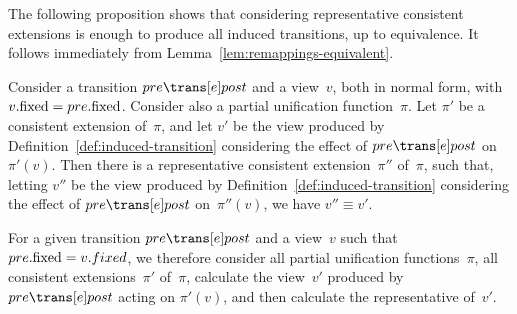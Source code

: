 
The following proposition shows that considering representative consistent
extensions is enough to produce all induced transitions, up to equivalence.
It follows immediately from Lemma~\ref{lem:remappings-equivalent}.
%
\begin{prop}
\label{prop:unifying-remapping}
Consider a transition $pre \trans[e] post$ and a view~$v$, both in normal
form, with $v.\mathrm{fixed} = pre.\mathrm{fixed}$.  Consider also a partial unification
function~$\pi$.
%
Let $\pi'$ be a consistent extension of~$\pi$, and
let $v'$ be the view produced by Definition~\ref{def:induced-transition}
considering the effect of $pre \trans[e] post$ on~$\pi'(v)$.  
%
Then there is a representative consistent extension~$\pi''$ of~$\pi$, such
that, letting $v''$ be the view produced by
Definition~\ref{def:induced-transition} considering the effect of $pre
\trans[e] post$ on~$\pi''(v)$, we have $v'' \equiv v'$.
\end{prop}


For a given transition $pre \trans[e] post$ and a view~$v$ such that
$pre.\mathrm{fixed} = v.fixed$, we therefore consider all partial unification
functions~$\pi$, all consistent extensions~$\pi'$ of~$\pi$, calculate the
view~$v'$ produced by $pre \trans[e] post$ acting on $\pi'(v)$, and then
calculate the representative of~$v'$.





